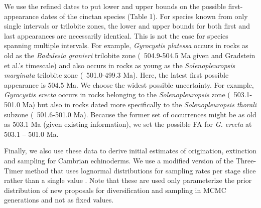 \documentclass{article}
\begin{document}
We use the refined dates to put lower and upper bounds on the possible first-appearance dates of the cinctan species (Table 1). For species known from only single intervals or trilobite zones, the lower and upper bounds for both first and last appearances are necessarily identical. This is not the case for species spanning multiple intervals. For example, \textit{Gyrocystis platessa} occurs in rocks as old as the \textit{Badulesia granieri} trilobite zone (~504.9-504.5 Ma given \cite{Geyer2019} and Gradstein et al.’s timescale) and also occurs in rocks as young as the \textit{Solenopleuropsis marginata} trilobite zone (~501.0-499.3 Ma).  Here, the latest first possible appearance is 504.5 Ma. We choose the widest possible uncertainty. For example, \textit{Gyrocystis erecta} occurs in rocks belonging to the \textit{Solenopleuropsis} zone (~503.1-501.0 Ma) but also in rocks dated more specifically to the \textit{Solenopleuropsis thorali} subzone (~501.6-501.0 Ma). Because the former set of occurrences might be as old as 503.1 Ma (given existing information), we set the possible FA for \textit{G. erecta} at 503.1 – 501.0 Ma.

Finally, we also use these data to derive initial estimates of origination, extinction and sampling for Cambrian echinoderms. We use a modified version of the Three-Timer method \citep{Alroy2015} that uses lognormal distributions for sampling rates per stage slice rather than a single value \citep{WagnerMarcot2013}. Note that these are used only parameterize the prior distribution of new proposals for diversification and sampling in MCMC generations and not as fixed values.
\end{document}
